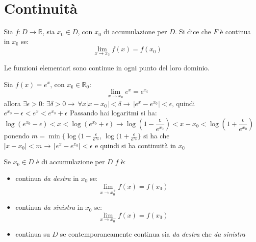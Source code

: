 \documentclass[a4paper,12pt, oneside]{book}
\begin{document}
\section{Continuità}
Sia $f:D\rightarrow \mathbb{R}$, sia $x_0\in D$, con $x_0$ di accumulazione per $D$. Si dice che $F$ è continua in $x_0$ se:
$$\lim_{x\rightarrow x_0} f(x)=f(x_0)$$
\begin{teorema}
Le funzioni elementari sono continue in ogni punto del loro dominio.
\end{teorema}
\begin{esempio}
Sia $f(x)=e^x$, con $x_0\in\mathbb{R}_0$:
$$\lim_{x\rightarrow x_0} e^x=e^{x_0}$$
allora $\exists \epsilon>0:\,\exists \delta>0\rightarrow \, \forall x |x-x_0|<\delta\rightarrow \, |e^x-e^{x_0}|<\epsilon$, quindi $e^{x_0}-\epsilon<e^x<e^{x_0}+\epsilon$
Passando hai logaritmi si ha:
$$\log(e^{x_0}-\epsilon)<x<\log(e^{x_0}+\epsilon)\longrightarrow \log(1-\frac{\epsilon}{e^{x_0}})<x-x_0<\log(1+\frac{\epsilon}{e^{x_0}})$$
ponendo $m=\min\{\log(1-\frac{\epsilon}{e^{x_0}},\,\log(1+\frac{\epsilon}{e^{x_0}}\}$ si ha che $|x-x_0|<m\rightarrow \, |e^x-e^{x_0}|<\epsilon$ e quindi si ha continuità in $x_0$
\end{esempio}
\begin{nota}
Se $x_0\in D$ è di accumulazione per $D$ $f$ è:
\begin{itemize}
\item continua \textit{da destra} in $x_0$ se:
$$\lim_{x\rightarrow x_0^{+}} f(x)=f(x_0)$$
\item continua \textit{da sinistra} in $x_0$ se:
$$\lim_{x\rightarrow x_0^{-}} f(x)=f(x_0)$$
\item continua su $D$ se contemporaneamente continua sia \textit{da destra} che \textit{da sinistra}
\end{itemize}
\end{nota}
\newpage
\end{document}
